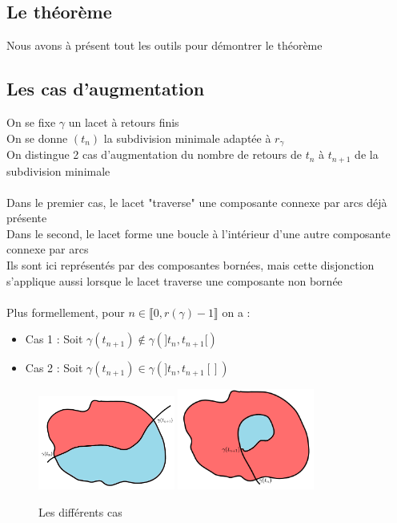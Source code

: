 \documentclass{article}
\begin{document}
\begin{flushleft}
\section{Le théorème}

Nous avons à présent tout les outils pour démontrer le théorème

\subsection{Les cas d'augmentation}

On se fixe $\gamma$ un lacet à retours finis\\
On se donne $(t_n)$ la subdivision minimale adaptée à $r_{\gamma}$\\
On distingue 2 cas d'augmentation du nombre de retours de $t_n$ à $t_{n+1}$ de la subdivision minimale
\\~\\

Dans le premier cas, le lacet "traverse" une composante connexe par arcs déjà présente\\
Dans le second, le lacet forme une boucle à l'intérieur d'une autre composante connexe par arcs\\
Ils sont ici représentés par des composantes bornées, mais cette disjonction s'applique aussi lorsque le lacet traverse une composante
non bornée
\\~\\
Plus formellement, pour $n \in \llbracket 0, r(\gamma) -1 \rrbracket$ on a :
\begin{itemize}
    \item Cas 1 : Soit $\gamma(t_{n+1}) \notin \gamma(]t_n, t_{n+1}[)$\\
    \item Cas 2 : Soit $\gamma(t_{n+1}) \in \gamma(]t_n, t_{n+1}[])$
\end{itemize}

\begin{figure}[h]
    \caption{Les différents cas}
    \centering
    \includegraphics*[width=0.4\textwidth]{Cas 1.png}
    \includegraphics*[width=0.4\textwidth]{Cas 2.png}
\end{figure}


\end{flushleft}
\end{document}
